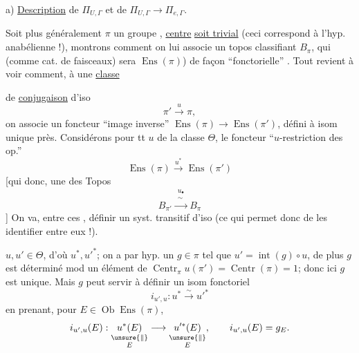 a) \uline{Description} de \(\Pi_{U,\Gamma}\) et de \(\Pi_{U,\Gamma}\longrightarrow\Pi_{e,\Gamma}\).

Soit plus généralement \(\pi\) un groupe ,  
\uline{centre} \uline{soit trivial} (ceci correspond à l'hyp.
anabélienne !), montrons comment on
lui associe un topos classifiant
\(B_\pi\), qui (comme cat. de faisceaux) sera
\(\operatorname{Ens}(\pi)\)) de façon ``fonctorielle'' . Tout
revient à voir comment, à une \uline{classe}

de \uline{conjugaison} \inserted{\(\Theta\)} d'iso
\[
\pi'\xrightarrow{u}\pi,
\]
on associe un foncteur ``image inverse''
\(\operatorname{Ens}(\pi)\longrightarrow\operatorname{Ens}(\pi')\), défini à isom unique
près. Considérons pour tt \(u\) de la classe
\(\Theta\), le foncteur ``\(u\)-restriction des op.''
\[
\operatorname{Ens}(\pi)\xrightarrow{u^*}\operatorname{Ens}(\pi')
\]
[qui  donc, 
une  des Topos
\[
B_{\pi'}\xrightarrow{\substack{u_\bullet\\ \sim}} B_\pi
\]
]
On va, entre ces ,  définir un
syst. transitif d'iso (ce qui permet
donc de les identifier entre eux !).

 \(u,u'\in\Theta\), d'où \(u^*,u'^*\); on a par hyp.
 un \(g\in\pi\) tel que \(u'=\operatorname{int}(g)\circ u\),
de plus \(g\) est déterminé mod un
élément de \(\operatorname{Centr}_\pi u(\pi')=\operatorname{Centr}(\pi)=1\);
donc ici \(g\) est unique. Mais \(g\)
peut servir à définir un isom
fonctoriel 
\[
i_{u',u}:u^*\xrightarrow{\sim}u'^*
\]
en prenant, pour \(E\in\operatorname{Ob}\operatorname{Ens}(\pi)\),
\[
i_{u',u}(E):
\underset{\substack{\unsure{\Vert}\\E}}{u^*(E)}
\longrightarrow
\underset{\substack{\unsure{\Vert}\\E}}{u'^*(E)},
\qquad i_{u',u}(E)=g_E.
\]

